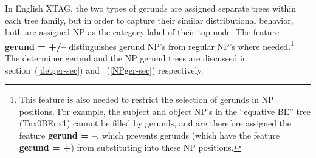 \beginsentences
{}\label{ex:273} 
\label{ex:274} 
\label{ex:275} 
\label{ex:276} 
\label{ex:277} 
\label{ex:278} 
\label{ex:279} 
\label{ex:280} 
\endsentences

 
In English XTAG, the two types of gerunds are assigned separate 
trees within each tree family, but in order to capture their similar 
distributional behavior, both are assigned NP as the category label of 
their top node. The feature {\bf gerund = +/--} distinguishes gerund NP's from 
regular NP's where needed.\footnote{This feature is also needed to restrict the selection of gerunds in NP positions. For example, the subject and object NP's in the ``equative BE'' tree (Tnx0BEnx1) cannot be filled by gerunds, and are therefore assigned the feature {\bf gerund = --}, which prevents gerunds (which have the feature {\bf gerund = +}) from substituting into these NP positions.} The determiner gerund 
and the NP gerund trees are discussed in section~(\ref{detger-sec}) and 
~(\ref{NPger-sec}) respectively. 
 
